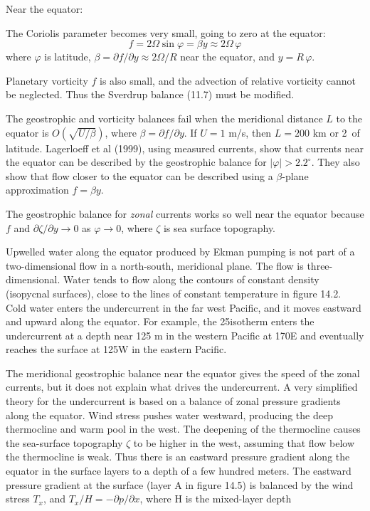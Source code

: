 Near the equator:
\begin{enumerate}
\vitem The Coriolis parameter
becomes very small, going to zero at the equator:
\begin{equation}
f=2\Omega \sin\varphi = \beta y \approx 2\Omega \,\varphi
\end{equation}
where $\varphi$ is latitude, $\beta = \partial f/\partial y \approx
2\Omega/R$ near the equator, and $y=R\,\varphi$.

\vitem Planetary vorticity $f$ is also small, and the advection of
relative vorticity cannot be neglected. Thus the Sverdrup balance
(11.7) must be modified.

\vitem The geostrophic
and vorticity balances fail when the meridional distance $L$ to the
equator is $O\left(\sqrt{U/\beta}\right)$, where
$\beta = \partial f / \partial y$.
If $U=1$ m/s, then $L=200$ km or 2\degrees\ of
latitude. Lagerloeff et al (1999), using measured currents, show that
currents near the equator can be described by the geostrophic
balance for
$|\varphi | > 2.2^{\circ}$. They also show that flow closer to the equator can be
described using a $\beta $-plane
approximation $f = \beta y$.

\vitem The geostrophic balance for \textit{zonal} currents works so
well near the equator because $f$ and $\partial \zeta/\partial y
\rightarrow 0$ as $\varphi \rightarrow 0$, where $\zeta$ is sea
surface topography.
\end{enumerate}
\vspace{-1.5ex}

Upwelled water along the equator produced by Ekman pumping is not part of a two-dimensional flow in a north-south,
meridional plane. The flow is three-dimensional. Water tends to flow
along the contours of constant density (isopycnal surfaces), close to
the lines of constant temperature in figure 14.2.  Cold water enters
the undercurrent in the far west Pacific, and it moves eastward and
upward along the equator. For example, the 25\degrees isotherm enters
the undercurrent at a depth near 125 m in the western Pacific at
170\degrees E and eventually reaches the surface at 125\degrees W in
the eastern Pacific.

The meridional geostrophic balance near the equator gives the speed of
the zonal currents, but it does not explain what drives the
undercurrent. A very simplified theory for the undercurrent is based
on a balance of zonal pressure gradients along the equator. Wind
stress pushes water westward, producing the deep
thermocline and warm pool in the west. The
deepening of the thermocline causes the
sea-surface topography $\zeta$ to be higher in the west, assuming that
flow below the thermocline is weak. Thus there is an eastward pressure
gradient along the equator in the surface layers to a depth of a few
hundred meters. The eastward pressure gradient at the surface (layer A
in figure 14.5) is balanced by the wind stress $T_x $, and $T_x / H = -\partial p/\partial x$,
where H is the mixed-layer depth

